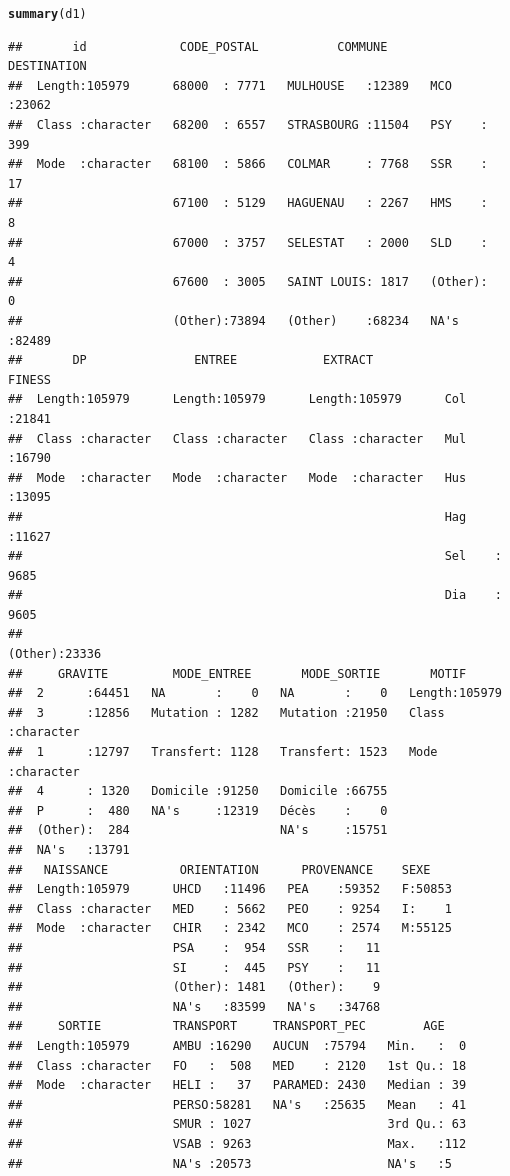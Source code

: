 \documentclass[12pt,english,french]{report}\usepackage{graphicx, color}
\makeatletter
\newcommand{\hlfunctioncall}[1]{\textcolor[rgb]{0.501960784313725,0,0.329411764705882}{\textbf{#1}}}%
\newenvironment{kframe}{%
 \def\at@end@of@kframe{}%
 \ifinner\ifhmode%
  \def\at@end@of@kframe{\end{minipage}}%
  \begin{minipage}{\columnwidth}%
 \fi\fi%
 \def\FrameCommand##1{\hskip\@totalleftmargin \hskip-\fboxsep
 \colorbox{shadecolor}{##1}\hskip-\fboxsep
     \hskip-\linewidth \hskip-\@totalleftmargin \hskip\columnwidth}%
 \MakeFramed {\advance\hsize-\width
   \@totalleftmargin\z@ \linewidth\hsize
   \@setminipage}}%
 {\par\unskip\endMakeFramed%
 \at@end@of@kframe}
\newenvironment{knitrout}{}{} %
\makeatother
\begin{document}
\begin{knitrout}
\begin{kframe}
\begin{alltt}
\hlfunctioncall{summary}(d1)
\end{alltt}
\begin{verbatim}
##       id             CODE_POSTAL           COMMUNE       DESTINATION   
##  Length:105979      68000  : 7771   MULHOUSE   :12389   MCO    :23062  
##  Class :character   68200  : 6557   STRASBOURG :11504   PSY    :  399  
##  Mode  :character   68100  : 5866   COLMAR     : 7768   SSR    :   17  
##                     67100  : 5129   HAGUENAU   : 2267   HMS    :    8  
##                     67000  : 3757   SELESTAT   : 2000   SLD    :    4  
##                     67600  : 3005   SAINT LOUIS: 1817   (Other):    0  
##                     (Other):73894   (Other)    :68234   NA's   :82489  
##       DP               ENTREE            EXTRACT              FINESS     
##  Length:105979      Length:105979      Length:105979      Col    :21841  
##  Class :character   Class :character   Class :character   Mul    :16790  
##  Mode  :character   Mode  :character   Mode  :character   Hus    :13095  
##                                                           Hag    :11627  
##                                                           Sel    : 9685  
##                                                           Dia    : 9605  
##                                                           (Other):23336  
##     GRAVITE         MODE_ENTREE       MODE_SORTIE       MOTIF          
##  2      :64451   NA       :    0   NA       :    0   Length:105979     
##  3      :12856   Mutation : 1282   Mutation :21950   Class :character  
##  1      :12797   Transfert: 1128   Transfert: 1523   Mode  :character  
##  4      : 1320   Domicile :91250   Domicile :66755                     
##  P      :  480   NA's     :12319   Décès    :    0                     
##  (Other):  284                     NA's     :15751                     
##  NA's   :13791                                                         
##   NAISSANCE          ORIENTATION      PROVENANCE    SEXE     
##  Length:105979      UHCD   :11496   PEA    :59352   F:50853  
##  Class :character   MED    : 5662   PEO    : 9254   I:    1  
##  Mode  :character   CHIR   : 2342   MCO    : 2574   M:55125  
##                     PSA    :  954   SSR    :   11            
##                     SI     :  445   PSY    :   11            
##                     (Other): 1481   (Other):    9            
##                     NA's   :83599   NA's   :34768            
##     SORTIE          TRANSPORT     TRANSPORT_PEC        AGE     
##  Length:105979      AMBU :16290   AUCUN  :75794   Min.   :  0  
##  Class :character   FO   :  508   MED    : 2120   1st Qu.: 18  
##  Mode  :character   HELI :   37   PARAMED: 2430   Median : 39  
##                     PERSO:58281   NA's   :25635   Mean   : 41  
##                     SMUR : 1027                   3rd Qu.: 63  
##                     VSAB : 9263                   Max.   :112  
##                     NA's :20573                   NA's   :5
\end{verbatim}
\end{kframe}
\end{knitrout}
\end{document}
